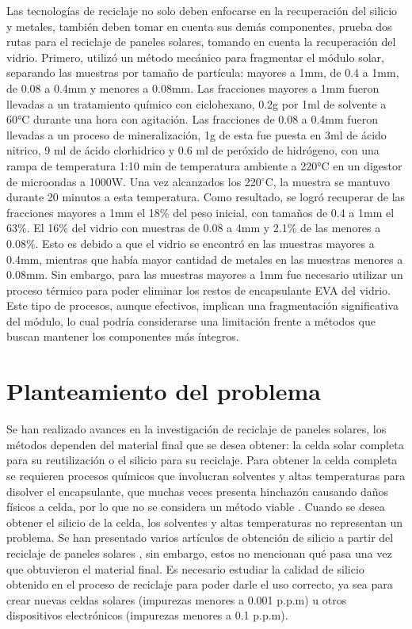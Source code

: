 Las tecnologías de reciclaje no solo deben enfocarse en la recuperación del silicio y metales, también deben tomar en cuenta sus demás componentes, \citet{Pagnanelli2019} prueba dos rutas para el reciclaje de paneles solares, tomando en cuenta la recuperación del vidrio. Primero, utilizó un método mecánico para fragmentar el módulo solar, separando las muestras por tamaño de partícula: mayores a 1mm, de 0.4 a 1mm, de 0.08 a 0.4mm y menores a 0.08mm. Las fracciones mayores a 1mm fueron llevadas a un tratamiento químico con ciclohexano, 0.2g por 1ml de solvente a 60°C durante una hora con agitación. Las fracciones de 0.08 a 0.4mm fueron llevadas a un proceso de mineralización, 1g de esta fue puesta en 3ml de ácido nitrico, 9 ml de ácido clorhidrico y 0.6 ml de peróxido de hidrógeno, con una rampa de temperatura 1:10 min de temperatura ambiente a 220°C en un digestor de microondas a 1000W. Una vez alcanzados los 220$^{\circ}$C, la muestra se mantuvo durante 20 minutos a esta temperatura. Como resultado, se logró recuperar de las fracciones mayores a 1mm el 18\% del peso inicial, con tamaños de 0.4 a 1mm el 63\%. El 16\% del vidrio con muestras de 0.08 a 4mm y 2.1\% de las menores a 0.08\%. Esto es debido a que el vidrio se encontró en las muestras mayores a 0.4mm, mientras que había mayor cantidad de metales en las muestras menores a 0.08mm. Sin embargo, para las muestras mayores a 1mm fue necesario utilizar un proceso térmico para poder eliminar los restos de encapsulante EVA del vidrio. Este tipo de procesos, aunque efectivos, implican una fragmentación significativa del módulo, lo cual podría considerarse una limitación frente a métodos que buscan mantener los componentes más íntegros.
 

\section{Planteamiento del problema}
\label{sec:Planteamiento}

Se han realizado avances en la investigación de reciclaje de paneles solares, los métodos dependen del material final que se desea obtener: la celda solar completa para su reutilización o el silicio para su reciclaje. Para obtener la celda completa se requieren procesos químicos que involucran solventes y altas temperaturas para disolver el encapsulante, que muchas veces presenta hinchazón causando daños físicos a celda, por lo que no se considera un método viable \citep{Kim2012}. Cuando se desea obtener el silicio de la celda, los solventes y altas temperaturas no representan un problema. Se han presentado varios artículos de obtención de silicio a partir del reciclaje de paneles solares \citep{Azeumo2019,Ardente2019,Fiandra2019}, sin embargo, estos no mencionan qué pasa una vez que obtuvieron el material final. Es necesario estudiar la calidad de silicio obtenido en el proceso de reciclaje para poder darle el uso correcto, ya sea para crear nuevas celdas solares (impurezas menores a 0.001 p.p.m) u otros dispositivos electrónicos (impurezas menores a 0.1 p.p.m)\citep{Martil2016}.  

